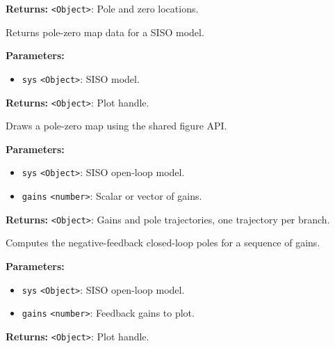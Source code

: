 \documentclass[12pt,a4paper]{article}
\begin{document}
\noindent \textbf{Returns:} \texttt{<Object>}: Pole and zero locations.

\noindent Returns pole-zero map data for a SISO model.

\vspace{5mm}
\noindent {}


\noindent \textbf{Parameters:}
\begin{itemize}
  \item \texttt{sys} \texttt{<Object>}: SISO model.
\end{itemize}

\noindent \textbf{Returns:} \texttt{<Object>}: Plot handle.

\noindent Draws a pole-zero map using the shared figure API.

\vspace{5mm}
\noindent {}


\noindent \textbf{Parameters:}
\begin{itemize}
  \item \texttt{sys} \texttt{<Object>}: SISO open-loop model.
  \item \texttt{gains} \texttt{<number>}: Scalar or vector of gains.
\end{itemize}

\noindent \textbf{Returns:} \texttt{<Object>}: Gains and pole trajectories, one trajectory per branch.

\noindent Computes the negative-feedback closed-loop poles for a sequence of gains.

\vspace{5mm}
\noindent {}


\noindent \textbf{Parameters:}
\begin{itemize}
  \item \texttt{sys} \texttt{<Object>}: SISO open-loop model.
  \item \texttt{gains} \texttt{<number>}: Feedback gains to plot.
\end{itemize}

\noindent \textbf{Returns:} \texttt{<Object>}: Plot handle.
\end{document}
